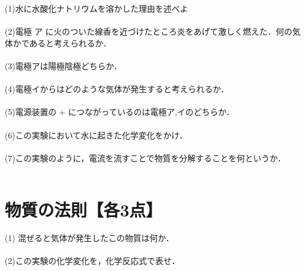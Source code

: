 \documentclass[autodetect-engine,dvi=dvipdfmx,ja=standard,
               a4j,11pt]{bxjsarticle}
\begin{document}
    (1)水に水酸化ナトリウムを溶かした理由を述べよ\\\\

    (2)電極 ア に火のついた線香を近づけたところ炎をあげて激しく燃えた．何の気体かであると考えられるか．\\\\

    (3)電極アは陽極陰極どちらか．\\\\

    (4)電極イからはどのような気体が発生すると考えられるか．\\\\

    (5)電源装置の + につながっているのは電極ア,イのどちらか．\\\\

    (6)この実験において水に起きた化学変化をかけ．\\\\

    (7)この実験のように，電流を流すことで物質を分解することを何というか．\\\\
    \clearpage
\section{物質の法則【各3点】}
\begin{figure}[htb]
        \centering
        \vspace{20pt} %
        \caption{}
\end{figure}
    (1) 混ぜると気体が発生したこの物質は何か．\\\\

    (2)この実験の化学変化を，化学反応式で表せ．\\\\
\end{document}
